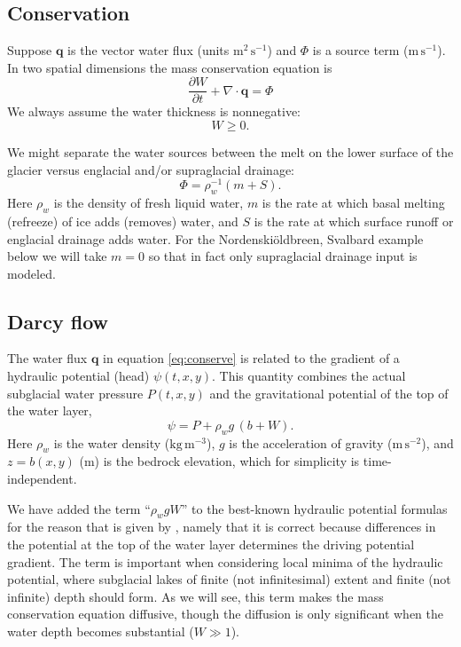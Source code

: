 \documentclass[11pt,final]{amsart}%
\newcommand\bq{\mathbf{q}}
\newcommand{\Div}{\nabla\cdot}
\newcommand{\Nbreen}{Nordenski\"oldbreen\xspace}
\begin{document}
\subsection*{Conservation}  Suppose $\bq$ is the vector water flux (units $\text{m}^2\,\text{s}^{-1}$) and $\Phi$ is a source term ($\text{m}\,\text{s}^{-1}$).  In two spatial dimensions the mass conservation equation is \citep{Clarke05}
\begin{equation} \label{eq:conserve}
\frac{\partial W}{\partial t} + \Div \bq = \Phi
\end{equation}
We always assume the water thickness is nonnegative:
\begin{equation}
W \ge 0.
\end{equation}

We might separate the water sources between the melt on the lower surface of the glacier versus englacial and/or supraglacial drainage:
\begin{equation}
\Phi = \rho_w^{-1} \left(m + S\right).  \label{drainagesplit}
\end{equation}
Here $\rho_w$ is the density of fresh liquid water, $m$ is the rate at which basal melting (refreeze) of ice adds (removes) water, and $S$ is the rate at which surface runoff or englacial drainage adds water.  For the \Nbreen, Svalbard example below we will take $m=0$ so that in fact only supraglacial drainage input is modeled.

\subsection*{Darcy flow}  The water flux $\bq$ in equation \eqref{eq:conserve} is related to the gradient of a hydraulic potential (head) $\psi(t,x,y)$.  This quantity combines the actual subglacial water pressure $P(t,x,y)$ and the gravitational potential of the top of the water layer,
\begin{equation} \label{eq:potential}
\psi = P + \rho_w g\, (b+W).
\end{equation}
Here $\rho_w$ is the water density ($\text{kg}\,\text{m}^{-3}$), $g$ is the acceleration of gravity ($\text{m}\,\text{s}^{-2}$), and $z=b(x,y)$ ($\text{m}$) is the bedrock elevation, which for simplicity is time-independent.

We have added the term ``$\rho_w g W$'' to the best-known hydraulic potential formulas \citep[e.g.]{Clarke05} for the reason that is given by \cite{Hewittetal2012}, namely that it is correct because differences in the potential at the top of the water layer determines the driving potential gradient.  The term is important when considering local minima of the hydraulic potential, where subglacial lakes of finite (not infinitesimal) extent and finite (not infinite) depth should form.  As we will see, this term makes the mass conservation equation diffusive, though the diffusion is only significant when the water depth becomes substantial ($W\gg 1$).
\end{document}
